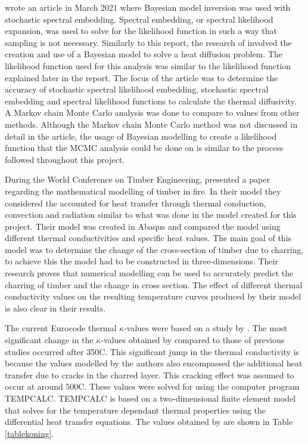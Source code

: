 \citeauthor{Wagner:2021} wrote an article in March 2021 where Bayesian model inversion was used with stochastic spectral embedding.
Spectral embedding, or spectral likelihood expansion, was used to solve for the likelihood function in such a way that sampling is not necessary.
Similarly to this report, the research of \citet{Wagner:2021} involved the creation and use of a Bayesian model to solve a heat diffusion problem.
The likelihood function used for this analysis was similar to the likelihood function explained later in the report.
The focus of the article was to determine the accuracy of stochastic spectral likelihood embedding, stochastic spectral embedding and spectral likelihood functions to calculate the thermal diffusivity.
A Markov chain Monte Carlo analysis was done to compare to values from other methods.
Although the Markov chain Monte Carlo method was not discussed in detail in the article, the usage of Bayesian modelling to create a likelihood function that the MCMC analysis could be done on is similar to the process followed throughout this project.

During the World Conference on Timber Engineering, \citet{Thi:2016} presented a paper regarding the mathematical modelling of timber in fire. 
In their model they considered the accounted for heat transfer through thermal conduction, convection and radiation similar to what was done in the model created for this project.
Their model was created in Abaqus and compared the model using different thermal conductivities and specific heat values.
The main goal of this model was to determine the change of the cross-section of timber due to charring, to achieve this the model had to be constructed in three-dimensions.
Their research proves that numerical modelling can be used to accurately predict the charring of timber and the change in cross section.
The effect of different thermal conductivity values on the resulting temperature curves produced by their model is also clear in their results.


The current Eurocode thermal $\kappa$-values were based on a study by \citet{Koning:1999}.
The most significant change in the $\kappa$-values obtained by \citeauthor{Koning:1999} compared to those of previous studies occurred after 350\textdegree C. 
This significant jump in the thermal conductivity is because the values modelled by the authors also encompassed the additional heat transfer due to cracks in the charred layer.
This cracking effect was assumed to occur at around 500\textdegree C.
These values were solved for using the computer program TEMPCALC.
TEMPCALC is based on a two-dimensional finite element model that solves for the temperature dependant thermal properties using the differential heat transfer equations.
The values obtained by \citeauthor{Koning:1999} are shown in Table \ref{tablekoning}.

